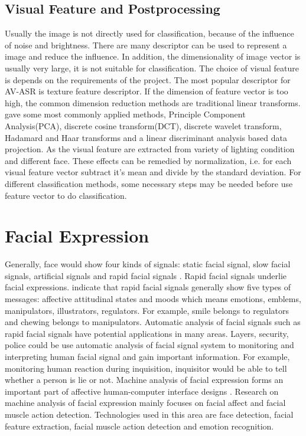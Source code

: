 \subsection{Visual Feature and Postprocessing}
Usually the image is not directly used for classification, because of the influence of noise and brightness. There are many descriptor can be used to represent a image and reduce the influence. In addition, the dimensionality of image vector is usually very large, it is not suitable for classification. The choice of visual feature is depends on the requirements of the project. The most popular descriptor for AV-ASR is texture feature descriptor. If the dimension of feature vector is too high, the common dimension reduction methods are traditional linear transforms. \cite{potamianos2003recent} gave some most commonly applied methods, Principle Component Analysis(PCA), discrete cosine transform(DCT), discrete wavelet transform, Hadamard and Haar transforms and a linear discriminant analysis based data projection. As the visual feature are extracted from variety of lighting condition and different face. These effects can be remedied by normalization, i.e. for each visual feature vector subtract it's mean and divide by the standard deviation. For different classification methods, some necessary steps may be needed before use feature vector to do classification.
\section{Facial Expression}
Generally, face would show four kinds of signals: static facial signal, slow facial signals, artificial signals and rapid facial signals \cite{pantic2007machine}. Rapid facial signals underlie facial expressions. \cite{pantic2007machine} indicate that rapid facial signals generally show five types of messages: affective attitudinal states and moods which means emotions, emblems, manipulators, illustrators, regulators. For example, smile belongs to regulators and chewing belongs to manipulators. Automatic analysis of facial signals such as rapid facial signals have potential applications in many areas. Layers, security, police could be use automatic analysis of facial signal system to monitoring and interpreting human facial signal and gain important information. For example, monitoring human reaction during inquisition, inquisitor would be able to tell whether a person is lie or not.  Machine analysis of facial expression forms an important part of affective human-computer interface designs \cite{pantic2007machine}.  Research on machine analysis of facial expression mainly focuses on facial affect and facial muscle action detection\cite{pantic2007machine}. Technologies used in this area are face detection, facial feature extraction, facial muscle action detection and emotion recognition\cite{pantic2007machine}.
